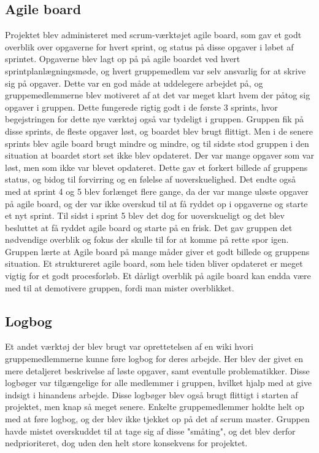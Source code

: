 \subsection{Agile board}
Projektet blev administeret med scrum-værktøjet agile board, som gav et godt overblik over opgaverne for hvert sprint, og status på disse opgaver
i løbet af sprintet. Opgaverne blev lagt op på på agile boardet ved hvert sprintplanlægningsmøde, og hvert gruppemedlem var selv ansvarlig for at skrive sig på
opgaver. Dette var en god måde at uddelegere arbejdet på, og gruppemedlemmerne blev motiveret af at det var meget klart hvem der påtog sig opgaver i gruppen.
Dette fungerede rigtig godt i de første 3 sprints, hvor begejstringen for dette nye værktøj også var tydeligt i gruppen. Gruppen fik på disse sprints, de 
fleste opgaver løst, og boardet blev brugt flittigt. Men i de senere sprints blev agile board brugt mindre og mindre, og til sidste stod gruppen i den situation
at boardet stort set ikke blev opdateret. Der var mange opgaver som var løst, men som ikke var blevet opdateret. Dette gav et forkert billede af 
gruppens status, og bidog til forvirring og en følelse af uoverskuelighed. Det endte også med at sprint 4 og 5 blev forlænget flere gange, da der var mange 
uløste opgaver på agile board, og der var ikke overskud til at få ryddet op i opgaverne og starte et nyt sprint. Til sidst i sprint 5 blev det dog for uoverskueligt
og det blev besluttet at få ryddet agile board og starte på en frisk. Det gav gruppen det nødvendige overblik og fokus der skulle til for at komme på rette
spor igen. Gruppen lærte at Agile board på mange måder giver et godt billede og gruppens situation. Et struktureret agile board, som hele tiden bliver opdateret 
er meget vigtig for et godt procesforløb. Et dårligt overblik på agile board kan endda være med til at demotivere gruppen, fordi man mister overblikket.  
 
\subsection{Logbog}
Et andet værktøj der blev brugt var oprettetelsen af en wiki hvori gruppemedlemmerne kunne føre logbog for deres arbejde. Her blev der givet en mere detaljeret 
beskrivelse af løste opgaver, samt eventulle problematikker. Disse logbøger var tilgængelige for alle medlemmer i gruppen, hvilket hjalp med at give indsigt i 
hinandens arbejde. Disse logbøger blev også brugt flittigt i starten af projektet, men knap så meget senere. Enkelte gruppemedlemmer holdte helt op med at 
føre logbog, og der blev ikke tjekket op på det af scrum master. Gruppen havde mistet overskuddet til at tage sig af disse "småting", og det blev derfor
nedprioriteret, dog uden den helt store konsekvens for projektet.

